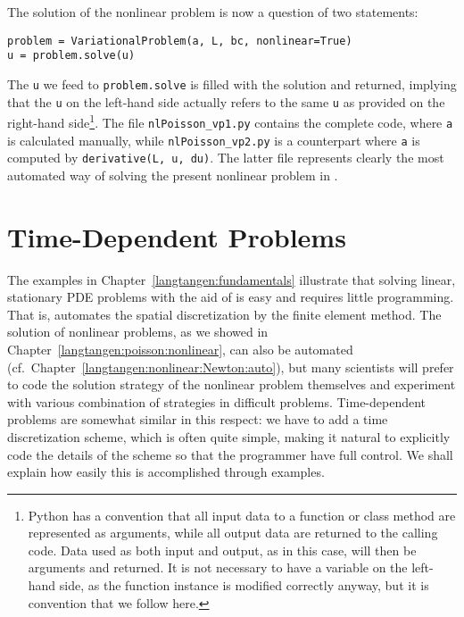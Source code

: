 The solution of the nonlinear problem is now a question of two statements:
\begin{Verbatim}[fontsize=\fontsize{10pt}{10pt},tabsize=8,baselinestretch=1.05,
fontfamily=tt,xleftmargin=7mm]
problem = VariationalProblem(a, L, bc, nonlinear=True)
u = problem.solve(u)
\end{Verbatim}
\noindent
The {\fontsize{12pt}{12pt}\texttt{u}} we feed to {\fontsize{12pt}{12pt}\texttt{problem.solve}} is filled with the solution
and returned, implying that the {\fontsize{12pt}{12pt}\texttt{u}} on the left-hand side actually
refers to the same {\fontsize{12pt}{12pt}\texttt{u}} as provided on the right-hand side\footnote{Python
has a convention that all input data to a function or class method are
represented as arguments, while all output data are returned to the calling
code. Data used as both input and output, as in this case, will then be
arguments and returned. It is not necessary to have a variable on the
left-hand side, as the function instance is modified correctly anyway,
but it is convention that we follow here.}.
The file {\fontsize{12pt}{12pt}\verb!nlPoisson_vp1.py!} contains the complete code, where
{\fontsize{12pt}{12pt}\texttt{a}} is calculated manually, while {\fontsize{12pt}{12pt}\verb!nlPoisson_vp2.py!} is
a counterpart where {\fontsize{12pt}{12pt}\texttt{a}} is computed by {\fontsize{12pt}{12pt}\texttt{derivative(L, u, du)}}.
The latter file represents clearly the most automated way of solving
the present nonlinear problem in \fenics.


\section{Time-Dependent Problems}
\label{langtangen:timedep}

The examples in Chapter~\ref{langtangen:fundamentals}
illustrate that solving linear, stationary PDE problems
with the aid of \fenics{} is easy and requires little programming.
That is, \fenics{} automates the spatial discretization by the
finite element method. 
The solution of nonlinear problems, as we showed in Chapter~\ref{langtangen:poisson:nonlinear}, can also be automated (cf.~Chapter~\ref{langtangen:nonlinear:Newton:auto}),
but many scientists will prefer to code the solution strategy of the
nonlinear problem themselves and experiment with various combination of
strategies in
difficult problems. Time-dependent problems are somewhat similar in
this respect: we have to add a time discretization scheme, which
is often quite simple, making it natural to explicitly code the
details of the scheme so that the programmer have full control.
We shall explain how easily this is accomplished through examples.

